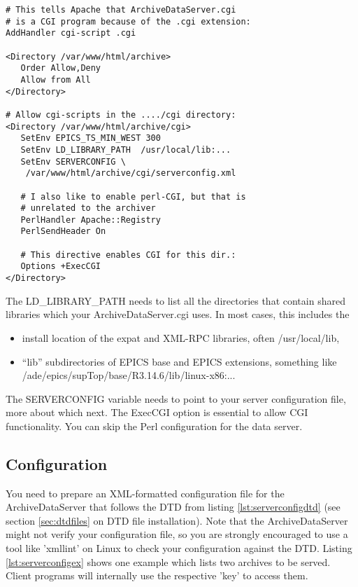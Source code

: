 \begin{enumerate}
\begin{lstlisting}[keywordstyle=\sffamily]
# This tells Apache that ArchiveDataServer.cgi
# is a CGI program because of the .cgi extension:
AddHandler cgi-script .cgi

<Directory /var/www/html/archive>
   Order Allow,Deny
   Allow from All
</Directory>

# Allow cgi-scripts in the ..../cgi directory:
<Directory /var/www/html/archive/cgi>
   SetEnv EPICS_TS_MIN_WEST 300
   SetEnv LD_LIBRARY_PATH  /usr/local/lib:...
   SetEnv SERVERCONFIG \
    /var/www/html/archive/cgi/serverconfig.xml

   # I also like to enable perl-CGI, but that is
   # unrelated to the archiver
   PerlHandler Apache::Registry
   PerlSendHeader On

   # This directive enables CGI for this dir.:
   Options +ExecCGI
</Directory>
\end{lstlisting}
  The LD\_LIBRARY\_PATH needs to list all the directories that
  contain shared libraries which your ArchiveDataServer.cgi uses.
  In most cases, this includes the
  \begin{itemize}
  \item install location of the expat and XML-RPC
        libraries, often /usr/local/lib,
  \item ``lib'' subdirectories of EPICS base and EPICS extensions,
        something like /ade/epics/supTop/base/R3.14.6/lib/linux-x86:...
  \end{itemize}
  The SERVERCONFIG variable needs to point to your server configuration
  file, more about which next. The ExecCGI option is essential to
  allow CGI functionality. You can skip the Perl configuration for the
  data server.
\end{enumerate}

\subsection{Configuration}  %
You need to prepare an XML-formatted configuration file for the
ArchiveDataServer that follows the DTD from listing
\ref{lst:serverconfigdtd} (see section \ref{sec:dtdfiles} on DTD file
installation). Note that the ArchiveDataServer might not verify your
configuration file, so you are strongly encouraged to use a tool like
'xmllint' on Linux to check your configuration against the
DTD. Listing \ref{lst:serverconfigex} shows one example 
 which lists two archives to be served. Client
programs will internally use the respective 'key' to access them.

